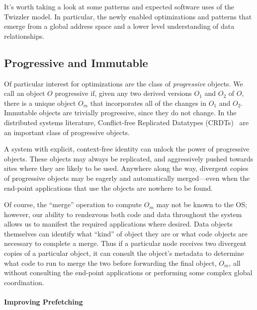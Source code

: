     It's worth taking a look at some patterns and expected software uses of the Twizzler model. In particular, the newly
    enabled optimizations and patterns that emerge from a global address space and a lower level understanding of data relationships.

    \subsection{Progressive and Immutable}

    Of particular interest for optimizations are the class of \emph{progressive} objects.
    We call an object $O$ progressive if,
    given any two derived versions $O_1$ and $O_2$ of $O$, there is a unique object $O_m$ that incorporates all of the changes in $O_1$ and $O_2$.
    Immutable objects are trivially progressive, since they do not change.
    In the distributed systems literature, Conflict-free Replicated Datatypes
    (CRDTs)~\cite{shapiro2011comprehensive}
    are an important class of progressive objects.

    A system with explicit, context-free identity can unlock the power of progressive objects.
    These objects may always be replicated, and aggressively pushed towards
    sites where they are likely to be used.
    Anywhere along the way, divergent copies of progressive objects may be eagerly and automatically
    merged---even when the end-point applications that use the objects are nowhere to be found.

    Of course, the ``merge'' operation to compute $O_m$ may not be known to the OS; however, our
    ability to rendezvous both code and data throughout the system allows us to manifest the required
    applications where desired. Data objects themselves can identify what ``kind'' of object they are or
    what code objects are necessary to complete a merge.
    Thus if a particular node receives two divergent copies of a particular object, it can consult the
    object's metadata to determine what code to run to merge the two before forwarding the final object,
    $O_m$, all without consulting the end-point applications or performing some complex global
    coordination.


    \paragraph{Improving Prefetching}
    \label{sec:prefetch}

